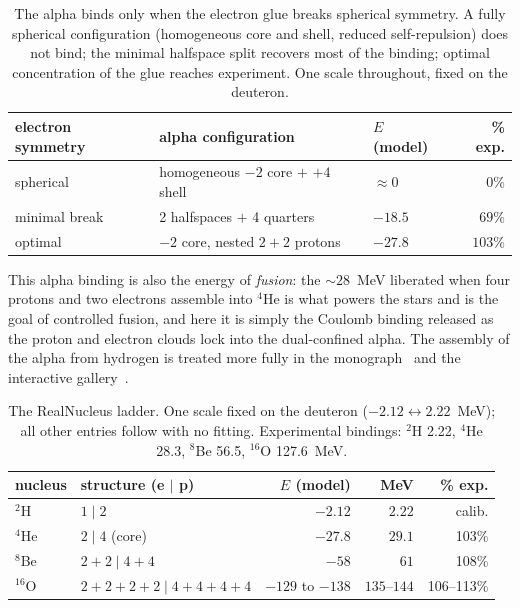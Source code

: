 \documentclass[11pt]{article}
\begin{document}
\begin{table}[t]
\centering
\begin{tabular}{lllr}
\toprule
electron symmetry & alpha configuration & $E$ (model) & \% exp.\\
\midrule
spherical & homogeneous $-2$ core $+$ $+4$ shell & $\approx 0$ & $0\%$\\
minimal break & 2 halfspaces $+$ 4 quarters & $-18.5$ & $69\%$\\
optimal & $-2$ core, nested $2{+}2$ protons & $-27.8$ & $103\%$\\
\bottomrule
\end{tabular}
\caption{The alpha binds only when the electron glue breaks spherical symmetry. A fully spherical
configuration (homogeneous core and shell, reduced self-repulsion) does not bind; the minimal
halfspace split recovers most of the binding; optimal concentration of the glue reaches
experiment. One scale throughout, fixed on the deuteron.}
\label{tab:symmetry}
\end{table}

This alpha binding is also the energy of \emph{fusion}: the ${\sim}28$~MeV liberated when four
protons and two electrons assemble into $^4$He is what powers the stars and is the goal of
controlled fusion, and here it is simply the Coulomb binding released as the proton and electron
clouds lock into the dual-confined alpha. The assembly of the alpha from hydrogen is treated more
fully in the monograph~\cite{Johnson-Book} and the interactive gallery~\cite{Gallery}.

\begin{table}[t]
\centering
\begin{tabular}{llrrr}
\toprule
nucleus & structure (e $\mid$ p) & $E$ (model) & MeV & \% exp.\\
\midrule
$^2$H  & $1\mid 2$            & $-2.12$ & $2.22$  & calib.\\
$^4$He & $2\mid 4$ (core)     & $-27.8$ & $29.1$  & 103\%\\
$^8$Be & $2{+}2\mid 4{+}4$    & $-58$   & $61$    & 108\%\\
$^{16}$O & $2{+}2{+}2{+}2\mid 4{+}4{+}4{+}4$ & $-129$ to $-138$ & $135$--$144$ & 106--113\%\\
\bottomrule
\end{tabular}
\caption{The RealNucleus ladder. One scale fixed on the deuteron
($-2.12\leftrightarrow 2.22$~MeV); all other entries follow with no fitting. Experimental
bindings: $^2$H 2.22, $^4$He 28.3, $^8$Be 56.5, $^{16}$O 127.6~MeV.}
\label{tab:ladder}
\end{table}
\end{document}

